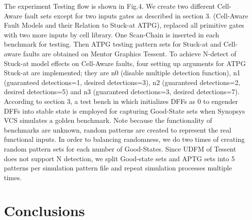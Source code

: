\documentclass[10 pt, technote]{IEEEtran}
\begin{document}
The experiment Testing flow is shown in Fig.4.  We create two different Cell-Aware fault sets except for two inputs gates as described in section 3. (Cell-Aware Fault Models and their Relation to Stuck-at ATPG), replaced all primitive gates with two more inputs by cell library.  One Scan-Chain is inserted in each benchmark for testing. Then ATPG testing pattern sets for Stuck-at and Cell-aware faults are obtained on Mentor Graphics Tessent. To achieve N-detect of Stuck-at model effects on Cell-Aware faults, four setting up arguments for ATPG Stuck-at are implemented; they are n0 (disable multiple detection function), n1 (guaranteed detections=1, desired detections=3), n2 (guaranteed detections=2, desired detections=5) and n3 (guaranteed detections=3, desired detections=7).  According to section 3, a test bench in which initializes DFFs as 0 to engender DFFs into stable state is employed for capturing Good-State sets when Synopsys VCS simulates a golden benchmark. Note because the functionality of benchmarks are unknown, random patterns are created to represent the real functional inputs.  In order to balancing randomness, we do two times of creating random pattern sets for each number of Good-States.  Since UDFM of Tessent does not support N detection, we split Good-state sets and APTG sets into 5 patterns per simulation pattern file and repeat simulation processes multiple times. 


\section{Conclusions}

{}
 
\end{document}
